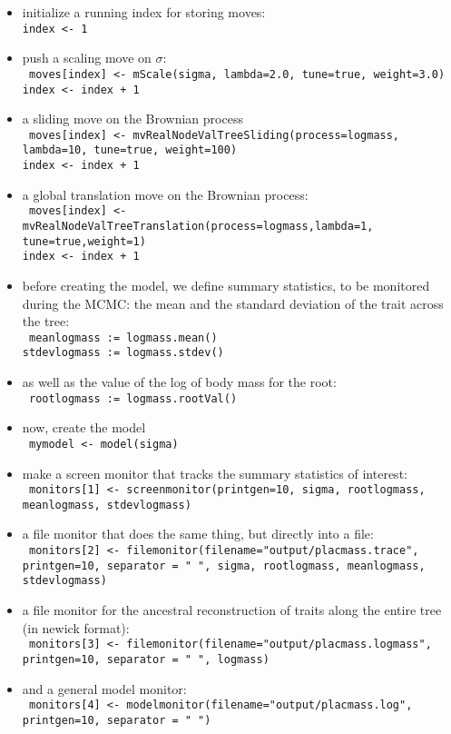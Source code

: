 \documentclass[usletter]{article}
\newcommand{\cmd}[1]{\texttt{#1}}
\begin{document}
\begin{itemize}
\item
initialize a running index for storing moves:
\\
\cmd{index <- 1}
\item
push a scaling move on $\sigma$:
\\
\cmd{
moves[index] <- mScale(sigma, lambda=2.0, tune=true, weight=3.0)
\\
index <- index + 1
}
\item
a sliding move on the Brownian process
\\
\cmd{
moves[index] <- mvRealNodeValTreeSliding(process=logmass, lambda=10, tune=true, weight=100)
\\
index <- index + 1
}
\item
a global translation move on the Brownian process:
\\
\cmd{
moves[index] <- mvRealNodeValTreeTranslation(process=logmass,lambda=1,
\\
tune=true,weight=1)
\\
index <- index + 1
}
\item
before creating the model, we define summary statistics, to be monitored during the MCMC: the mean and the standard deviation of the trait across the tree:
\\
\cmd{
meanlogmass := logmass.mean()
\\
stdevlogmass := logmass.stdev()
}
\item
as well as the value of the log of body mass for the root:
\\
\cmd{
rootlogmass := logmass.rootVal()
}
\item
now, create the model
\\
\cmd{
mymodel <- model(sigma)
}
\item
make a screen monitor that tracks the summary statistics of interest:
\\
\cmd{
monitors[1] <- screenmonitor(printgen=10, sigma, rootlogmass, meanlogmass, stdevlogmass)
}
\item
a file monitor that does the same thing, but directly into a file:
\\
\cmd{
monitors[2] <- filemonitor(filename="output/placmass.trace", printgen=10, separator = "       ", sigma, rootlogmass, meanlogmass, stdevlogmass)
}
\item
a file monitor for the ancestral reconstruction of traits along the entire tree (in newick format):
\\
\cmd{
monitors[3] <- filemonitor(filename="output/placmass.logmass", printgen=10, separator = "       ", logmass)
}
\item
and a general model monitor:
\\
\cmd{
monitors[4] <- modelmonitor(filename="output/placmass.log", printgen=10, separator = " ")
}
\end{itemize}
\end{document}

